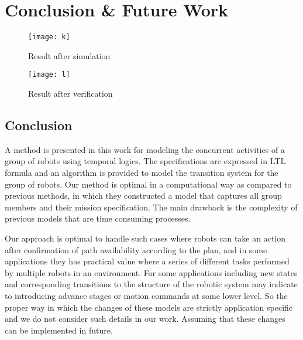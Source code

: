 
\chapter{Conclusion \& Future Work} %

\label{Chapter5} %



\begin{landscape}
\begin{figure}[h]
\centering
  \texttt{[image: k]}\\
  \caption{Result after simulation}
\end{figure}
\end{landscape}

\begin{landscape}
\begin{figure}[h]
\centering
  \texttt{[image: l]}\\
  \caption{Result after verification}
\end{figure}
\end{landscape}

\pagebreak
\section{Conclusion}
A method is presented in this work for modeling the concurrent activities of a group of robots using temporal logics. The specifications are expressed in LTL formula and an algorithm is provided to model the transition system for the group of robots. Our method is optimal in a computational way as compared to previous methods, in which they constructed a model that captures all group members and their mission specification. The main drawback is the complexity of previous models that are time consuming processes.

Our approach is optimal to handle such cases where robots can take an action after confirmation of path availability according to the plan, and in some applications they has practical value where a series of different tasks performed by multiple robots in an environment. For some applications including new states and corresponding transitions to the structure of the robotic system may indicate to introducing advance stages or motion commands at some lower level. So the proper way in which the changes of these models are strictly application specific and we do not consider such details in our work. Assuming that these changes can be implemented in future.



